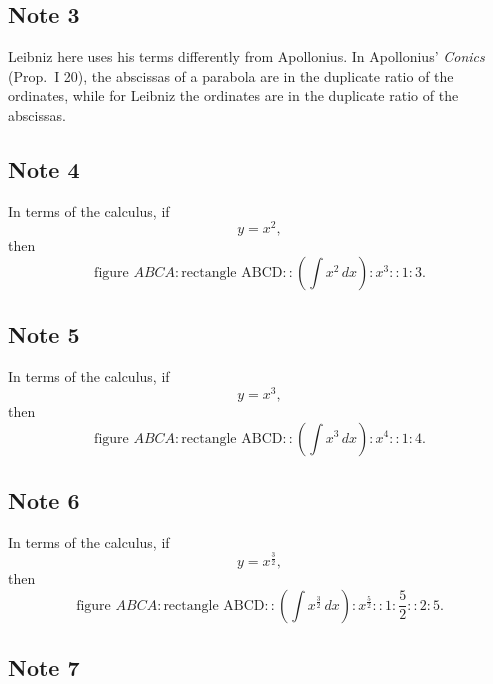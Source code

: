 \documentclass[twoside,openright]{article}
\begin{document}
\subsection*{Note 3}
\label{ctp3}

Leibniz here uses his terms differently from Apollonius.  In
Apollonius' {\em Conics} (Prop.\ I 20), the abscissas of a parabola
are in the duplicate ratio of the ordinates, while for Leibniz the
ordinates are in the duplicate ratio of the abscissas.

\subsection*{Note 4}
\label{ctp4}

In terms of the calculus, if
$$y = x^2,$$
then
$$\mbox{figure }ABCA \!:\! \mbox{rectangle ABCD} :: \left(\int\! x^2\,dx\right) \!:\! x^3 :: 1\!:\!3.$$

\subsection*{Note 5}
\label{ctp5}

In terms of the calculus, if
$$y = x^3,$$
then
$$\mbox{figure }ABCA \!:\! \mbox{rectangle ABCD} :: \left(\int\! x^3\,dx\right) \!:\! x^4 :: 1\!:\!4.$$

\subsection*{Note 6}
\label{ctp6}

In terms of the calculus, if
$$y = x^{\frac{3}{2}},$$
then
$$\mbox{figure }ABCA \!:\! \mbox{rectangle ABCD} :: \left(\int\! x^{\frac{3}{2}}\,dx\right) \!:\! x^{\frac{5}{2}} :: 1\!:\!\frac{5}{2} :: 2\!:\!5.$$

\subsection*{Note 7}
\label{ctp7}
\end{document}
